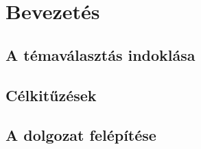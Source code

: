 \chapter{Bevezetés}
\label{ch:bevezetes}

\section{A témaválasztás indoklása}

\section{Célkitűzések}

\section{A dolgozat felépítése}
